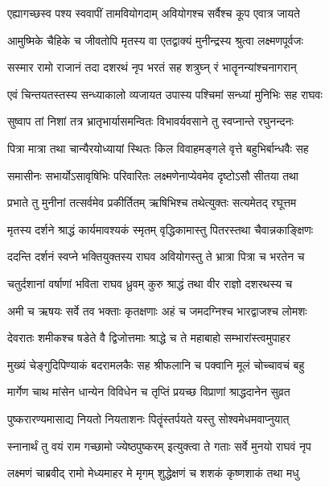 \twolineshloka
{एह्यागच्छस्व पश्य स्ववापीं तामवियोगदाम्}
{अवियोगश्च सर्वैश्च कूप एवात्र जायते} %

\twolineshloka
{आमुष्मिके चैहिके च जीवतोपि मृतस्य वा}
{एतद्वाक्यं मुनीन्द्रस्य श्रुत्वा लक्ष्मणपूर्वजः} %

\twolineshloka
{सस्मार रामो राजानं तदा दशरथं नृप}
{भरतं सह शत्रुघ्न् रं भातॄनन्यांश्चनागरान्} %

\twolineshloka
{एवं चिन्तयतस्तस्य सन्ध्याकालो व्यजायत}
{उपास्य पश्चिमां सन्ध्यां मुनिभिः सह राघवः} %

\twolineshloka
{सुष्वाप तां निशां तत्र भ्रातृभार्यासमन्वितः}
{विभावर्यवसाने तु स्वप्नान्ते रघुनन्दनः} %

\twolineshloka
{पित्रा मात्रा तथा चान्यैरयोध्यायां स्थितः किल}
{विवाहमङ्गले वृत्ते बहुभिर्बान्धवैः सह} %

\twolineshloka
{समासीनः सभार्योऽसावृषिभिः परिवारितः}
{लक्ष्मणेनाप्येवमेव दृष्टोऽसौ सीतया तथा} %

\twolineshloka
{प्रभाते तु मुनीनां तत्सर्वमेव प्रकीर्तितम्}
{ऋषिभिश्च तथेत्युक्तः सत्यमेतद् रघूत्तम} %

\twolineshloka
{मृतस्य दर्शने श्राद्धं कार्यमावश्यकं स्मृतम्}
{वृद्धिकामास्तु पितरस्तथा चैवान्नकाङ्क्षिणः} %

\twolineshloka
{ददन्ति दर्शनं स्वप्ने भक्तियुक्तस्य राघव}
{अवियोगस्तु ते भ्रात्रा पित्रा च भरतेन च} %

\twolineshloka
{चतुर्दशानां वर्षाणां भविता राघव ध्रुवम्}
{कुरु श्राद्धं तथा वीर राज्ञो दशरथस्य च} %

\twolineshloka
{अमी च ऋषयः सर्वे तव भक्ताः कृतक्षणाः}
{अहं च जमदग्निश्च भारद्वाजश्च लोमशः} %

\twolineshloka
{देवरातः शमीकश्च षडेते वै द्विजोत्तमाः}
{श्राद्धे च ते महाबाहो सम्भारांस्त्वमुपाहर} %

\twolineshloka
{मुख्यं चेङ्गुदिपिण्याकं बदरामलकैः सह}
{श्रीफलानि च पक्वानि मूलं चोच्चावचं बहु} %

\twolineshloka
{मार्गेण चाथ मांसेन धान्येन विविधेन च}
{तृप्तिं प्रयच्छ विप्राणां श्राद्धदानेन सुव्रत} %

\twolineshloka
{पुष्करारण्यमासाद्य नियतो नियताशनः}
{पितॄंस्तर्पयते यस्तु सोश्वमेधमवाप्नुयात्} %

\twolineshloka
{स्नानार्थं तु वयं राम गच्छामो ज्येष्ठपुष्करम्}
{इत्युक्त्वा ते गताः सर्वे मुनयो राघवं नृप} %

\twolineshloka
{लक्ष्मणं चाब्रवीद् रामो मेध्यमाहर मे मृगम्}
{शुद्धेक्षणं च शशकं कृष्णशाकं तथा मधु} %


